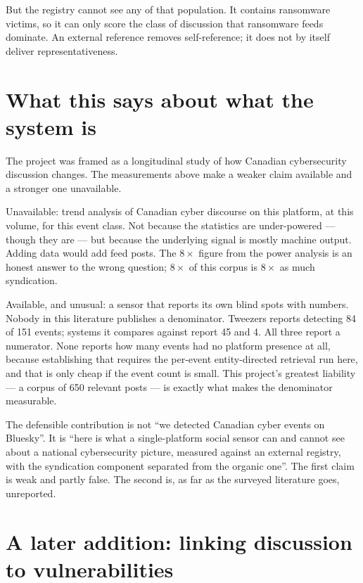\documentclass[11pt]{article}
\begin{document}
But the registry cannot see any of that population. It contains ransomware
victims, so it can only score the class of discussion that ransomware feeds
dominate. An external reference removes self-reference; it does not by itself
deliver representativeness.

\section{What this says about what the system is}

The project was framed as a longitudinal study of how Canadian cybersecurity
discussion changes. The measurements above make a weaker claim available and a
stronger one unavailable.

Unavailable: trend analysis of Canadian cyber discourse on this platform, at
this volume, for this event class. Not because the statistics are
under-powered --- though they are --- but because the underlying signal is
mostly machine output. Adding data would add feed posts. The $8\times$ figure
from the power analysis is an honest answer to the wrong question; $8\times$ of
this corpus is $8\times$ as much syndication.

Available, and unusual: a sensor that reports its own blind spots with
numbers. Nobody in this literature publishes a denominator. Tweezers reports
detecting 84 of 151 events; systems it compares against report 45 and 4. All
three report a numerator. None reports how many events had no platform
presence at all, because establishing that requires the per-event
entity-directed retrieval run here, and that is only cheap if the event count
is small. This
project's greatest liability --- a corpus of 650 relevant posts --- is exactly
what makes the denominator measurable.

\begin{keybox}
The defensible contribution is not ``we detected Canadian cyber events on
Bluesky''. It is ``here is what a single-platform social sensor can and cannot
see about a national cybersecurity picture, measured against an external
registry, with the syndication component separated from the organic one''. The
first claim is weak and partly false. The second is, as far as the surveyed
literature goes, unreported.
\end{keybox}

\section{A later addition: linking discussion to vulnerabilities}
\end{document}
